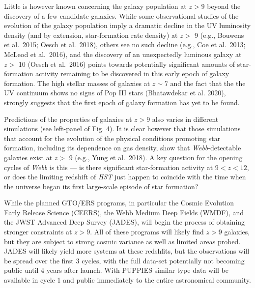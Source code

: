 \documentclass[12pt]{article}
\begin{document}
Little is however known concerning the galaxy population at $z > 9$ beyond the discovery of a few candidate galaxies.  While some observational studies of the evolution of the galaxy population imply a dramatic decline in the UV luminosity density (and by extension, star-formation rate density) at $z >$ 9 (e.g., Bouwens et al.\ 2015; Oesch et al.\ 2018), others see no such decline (e.g., Coe et al.\ 2013; McLeod et al.\ 2016), and the discovery of an unexpectedly luminous galaxy at $z >$ 10 (Oesch et al.\ 2016) points towards potentially significant amounts of star-formation activity remaining to be discovered in this early epoch of galaxy formation.    The high stellar masses of galaxies at $z \sim 7$ and the fact that the the UV continuum shows no signs of Pop III stars (Bhatawdekar et al. 2020), strongly suggests that the first epoch of galaxy formation has yet to be found.

Predictions of the properties of galaxies at $z > 9$ also varies in different simulations (see left-panel of Fig. 4). It is clear however that those simulations that account for the evolution of the physical conditions promoting star formation, including its dependence on gas density, show that {\it Webb}-detectable galaxies exist  at $z >$ 9 (e.g., Yung et al.\ 2018).  A key question for the opening cycles of {\it Webb} is this — is there significant star-formation activity at  $9<z<12$, or does the limiting redshift of {\it HST} just happen to coincide with the time when the universe began its first large-scale episode of star formation?

While the planned GTO/ERS programs, in particular the Cosmic Evolution Early Release Science (CEERS), the Webb Medium Deep Fields (WMDF), and the JWST Advanced Deep Survey (JADES), will begin the process of obtaining stronger constraints at $z>9$.   All of these programs  will likely find $z > 9$ galaxies, but they are subject to strong cosmic variance as well as limited areas probed.  JADES will likely yield more systems at these redshfits, but the observations will be spread over the first 3 cycles, with the full data-set potentially not becoming public until 4 years after launch.   With PUPPIES similar type data will be available in cycle 1 and public immediately to the entire astronomical community.
\end{document}
